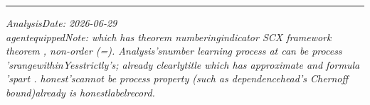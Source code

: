 \documentclass[
  12pt,
]{article}
\begin{document}
\begin{center}\rule{0.5\linewidth}{0.5pt}\end{center}

\emph{AnalysisDate: 2026-06-29}\\
\emph{agentequippedNote: which has theorem numberingindicator SCX
framework theorem , non-order (=). Analysis'snumber learning process at can be process 'srangewithinYesstrictly's; already clearlytitle which has approximate and formula 'spart . honest'scannot be process property (such as dependencehead's
Chernoff bound)already is honestlabelrecord. }
\end{document}
